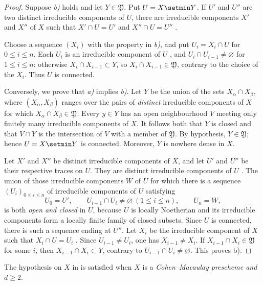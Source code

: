 \begin{proof}
Suppose \emph{b)} holds and let $Y\in\mathfrak Y$.  Put
$U=X\setmin Y$.  If $U'$ and $U''$ are two distinct irreducible
components of $U$, there are irreducible components $X'$ and
$X''$ of $X$ such that
$X'\cap U=U'$ and $X''\cap U=U''$ .


Choose a sequence $(X_i)$ with the property in \emph{b)}, and put
$U_i=X_i\cap U$ for $0\leq i\leq n$.  Each $U_i$ is an
irreducible component of $U$ , and
$U_i\cap U_{i-1}\ne\varnothing$ for $1\leq i\leq n$: otherwise
$X_i\cap X_{i-1}\subset Y$, so
$X_i\cap X_{i-1}\in\mathfrak Y$, contrary to the choice of the
$X_i$.  Thus $U$ is connected.

Conversely, we prove that \emph{a)} implies \emph{b)}.  Let $Y$ be the union of the
sets $X_\alpha\cap X_\beta$, where $(X_\alpha,X_\beta)$ ranges
over the pairs of \emph{distinct} irreducible components of $X$ for
which $X_\alpha\cap X_\beta\in\mathfrak Y$.  Every $y\in Y$ has
an open neighbourhood $V$ meeting only finitely many irreducible
components of $X$.  It follows both that $Y$ is closed and that
$V\cap Y$ is the intersection of $V$ with a member of
$\mathfrak Y$.  By hypothesis, $Y\in\mathfrak Y$; hence
$U=X\setmin Y$ is connected.  Moreover, $Y$ is nowhere dense in $X$.

Let $X'$ and $X''$ be distinct irreducible components of $X$, and
let $U'$ and $U''$ be their respective traces on $U$.  They are
distinct irreducible components of $U$ .
The union of those irreducible components $W$ of $U$ for which
there is a sequence $(U_i)_{0\leq i\leq n}$ of irreducible
components of $U$ satisfying
\[
  U_0=U',\qquad
  U_{i-1}\cap U_i\ne\varnothing\ (1\leq i\leq n),\qquad
  U_n=W,
\]
is both \emph{open and closed} in $U$, because $U$ is locally
Noetherian and its irreducible components form a locally finite
family of closed subsets.  Since $U$ is connected, there is such
a sequence ending at $U''$.  Let $X_i$ be the irreducible
component of $X$ such that $X_i\cap U=U_i$
.  Since $U_{i-1}\ne U_i$, one has
$X_{i-1}\ne X_i$.  If
$X_{i-1}\cap X_i\in\mathfrak Y$ for some $i$, then
$X_{i-1}\cap X_i\subset Y$, contrary to
$U_{i-1}\cap U_i\ne\varnothing$.  This proves {\rm b)}.
\end{proof}

The hypothesis on $X$ in  is satisfied when $X$
is a \emph{Cohen--Macaulay prescheme and} $d\geq2$.

